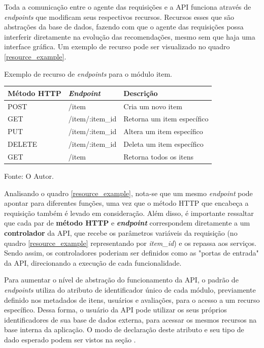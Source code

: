 Toda a comunicação entre o agente das requisições e a API funciona através de \textit{endpoints} que modificam seus respectivos recursos. Recursos esses que são abstrações da base de dados, fazendo com que o agente das requisições possa interferir diretamente na evolução das recomendações, mesmo sem que haja uma interface gráfica. Um exemplo de recurso pode ser visualizado no quadro \ref{resource_example}.

\begin{quadro}[h!tp]

	\caption{\label{resource_example}Exemplo de recurso de \textit{endpoints} para o módulo item.}
	\centering
	\begin{tabular}{|l|l|l|}
	\hline
	\textbf{Método HTTP} & \textit{\textbf{Endpoint}} & \textbf{Descrição}          \\ \hline
	POST                 & /item                      & Cria um novo item           \\ \hline
	GET                  & /item/:item\_id 			  & Retorna um item específico  \\ \hline
	PUT                  & /item/:item\_id            & Altera um item específico   \\ \hline
	DELETE               & /item/:item\_id            & Deleta um item específico   \\ \hline
	GET                  & /item                      & Retorna todos os itens      \\ \hline
	\end{tabular}

	Fonte: O Autor.

\end{quadro}

Analisando o quadro \ref{resource_example}, nota-se que um mesmo \textit{endpoint} pode apontar para diferentes funções, uma vez que o método HTTP que encabeça a requisição também é levado em consideração. Além disso, é importante ressaltar que cada par de \textbf{método HTTP} e \textbf{\textit{endpoint}} correspondem diretamente a um \textbf{controlador} da API, que recebe os parâmetros variáveis da requisição (no quadro \ref{resource_example} representando por \textit{item\_id}) e os repassa aos serviços. Sendo assim, os controladores poderiam ser definidos como as "portas de entrada" da API, direcionando a execução de cada funcionalidade.

Para aumentar o nível de abstração do funcionamento da API, o padrão de \textit{endpoints} utiliza do atributo de identificador único de cada módulo, previamente definido nos metadados de itens, usuários e avaliações, para o acesso a um recurso específico. Dessa forma, o usuário da API pode utilizar os seus próprios identificadores de sua base de dados externa, para acessar os mesmos recursos na base interna da aplicação. O modo de declaração deste atributo e seu tipo de dado esperado podem ser vistos na seção . 

